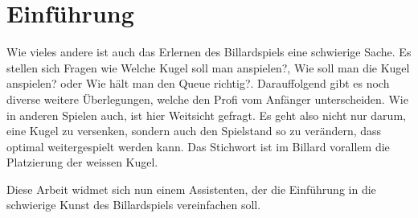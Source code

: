 \chapter{Einführung}
Wie vieles andere ist auch das Erlernen des Billardspiels eine schwierige Sache. Es stellen sich Fragen wie \glqq Welche
Kugel soll man anspielen?\grqq{}, \glqq Wie soll man die Kugel anspielen?\grqq{} oder \glqq Wie hält man den Queue richtig?\grqq{}.
Darauffolgend gibt es noch diverse weitere Überlegungen, welche den Profi vom Anfänger unterscheiden. Wie in anderen Spielen
auch, ist hier Weitsicht gefragt. Es geht also nicht nur darum, eine Kugel zu versenken, sondern auch den Spielstand so zu
verändern, dass optimal weitergespielt werden kann. Das Stichwort ist im Billard vorallem die Platzierung der weissen Kugel.

Diese Arbeit widmet sich nun einem Assistenten, der die Einführung in die schwierige Kunst des Billardspiels vereinfachen soll.